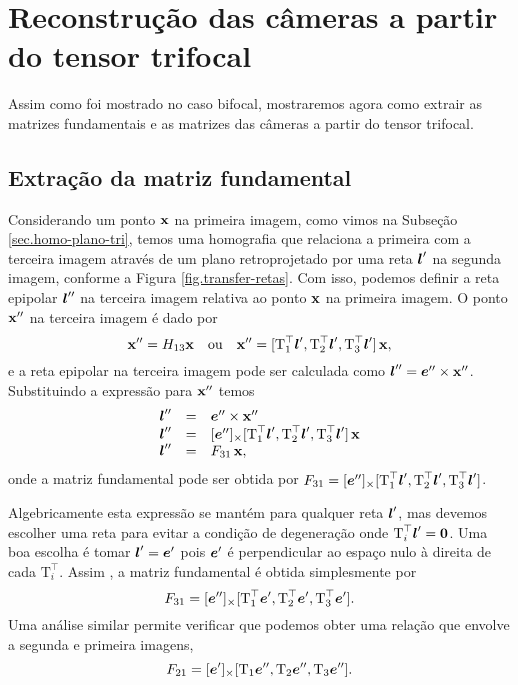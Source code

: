 \section{Reconstrução das câmeras a partir do tensor trifocal}
Assim como foi mostrado no caso bifocal, mostraremos agora como extrair as matrizes fundamentais e as matrizes das câmeras a partir do tensor trifocal.
\subsection{Extração da matriz fundamental}\label{sec.extracao-F-tri}
Considerando um ponto $\mathbf{x}$ na primeira imagem, como vimos na Subseção \ref{sec.homo-plano-tri}, temos uma homografia que relaciona a primeira com a terceira imagem através de um plano retroprojetado por uma reta $\boldsymbol{l}'$ na segunda imagem, conforme a Figura \ref{fig.transfer-retas}. Com isso, podemos definir a reta epipolar $\boldsymbol{l}''$ na terceira imagem relativa ao ponto $\mathbf{x}$ na primeira imagem. O ponto $\mathbf{x}''$ na terceira imagem é dado por
\begin{equation*}
\mathbf{x}''=H_{13}\mathbf{x}\quad\text{ou}\quad\mathbf{x}''=[\mbox{T}_1^\top\boldsymbol{l}',\mbox{T}_2^\top\boldsymbol{l}',\mbox{T}_3^\top\boldsymbol{l}']\,\mathbf{x},
\end{equation*}  
e a reta epipolar na terceira imagem pode ser calculada como $\boldsymbol{l}''=\boldsymbol{e}''\times\mathbf{x}''$. Substituindo a expressão para $\mathbf{x}''$ temos
\begin{equation*}
\begin{array}{rcl}
\boldsymbol{l}''&=&\boldsymbol{e}''\times\mathbf{x}''\\
\boldsymbol{l}''&=&[\boldsymbol{e}'']_\times[\mbox{T}_1^\top\boldsymbol{l}',\mbox{T}_2^\top\boldsymbol{l}',\mbox{T}_3^\top\boldsymbol{l}']\,\mathbf{x}\\
\boldsymbol{l}''&=&F_{31}\,\mathbf{x},
\end{array}
\end{equation*}
onde a matriz fundamental pode ser obtida por $F_{31}=[\boldsymbol{e}'']_\times[\mbox{T}_1^\top\boldsymbol{l}',\mbox{T}_2^\top\boldsymbol{l}',\mbox{T}_3^\top\boldsymbol{l}']$.

Algebricamente esta expressão se mantém para qualquer reta $\boldsymbol{l}'$, mas devemos escolher uma reta para evitar a condição de degeneração onde $\mbox{T}^\top_i\boldsymbol{l}'={\bf 0}$. Uma boa escolha é tomar $\boldsymbol{l}'=\boldsymbol{e}'$ pois $\boldsymbol{e}'$ é perpendicular ao espaço nulo à direita de cada $\mbox{T}^\top_i$. Assim , a matriz fundamental é obtida simplesmente por
\begin{equation*}
F_{31}=[\boldsymbol{e}'']_\times[\mbox{T}_1^\top\boldsymbol{e}',\mbox{T}_2^\top\boldsymbol{e}',\mbox{T}_3^\top\boldsymbol{e}'].
\end{equation*} 
Uma análise similar permite verificar que podemos obter uma relação que envolve a segunda e primeira imagens,
\begin{equation*}
F_{21}=[\boldsymbol{e}']_\times[\mbox{T}_1\boldsymbol{e}'',	\mbox{T}_2\boldsymbol{e}'',\mbox{T}_3\boldsymbol{e}''].
\end{equation*}
